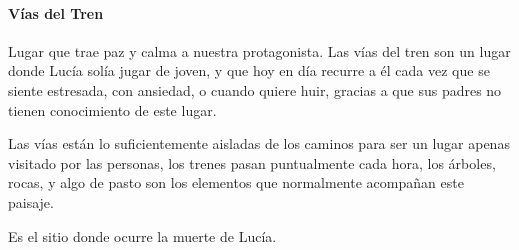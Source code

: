 \newpage
\paragraph{Vías del Tren}
Lugar que trae paz y calma a nuestra protagonista. Las vías del tren son un lugar donde Lucía solía jugar de joven, y que hoy en día recurre a él cada vez que se siente estresada, con ansiedad, o cuando quiere huir, gracias a que sus padres no tienen conocimiento de este lugar.

Las vías están lo suficientemente aisladas de los caminos para ser un lugar apenas visitado por las personas, los trenes pasan puntualmente cada hora, los árboles, rocas, y algo de pasto son los elementos que normalmente acompañan este paisaje.

Es el sitio donde ocurre la muerte de Lucía.

